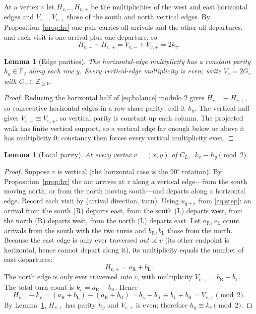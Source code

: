 \documentclass[11pt,letterpaper]{article}
\theoremstyle{plain}
\newtheorem{lemma}[theorem]{Lemma}
\theoremstyle{definition}
\newcommand{\Z}{\mathbb{Z}}
\newcommand{\F}{\mathbb{F}}
\newcommand{\turnR}{\mathrm{R}}
\newcommand{\turnL}{\mathrm{L}}
\begin{document}
\begin{NoHyper}
At a vertex $v$ let $H_{v,-},H_{v,+}$ be the multiplicities of the west and east
horizontal edges and $V_{v,-},V_{v,+}$ those of the south and north vertical edges.
By Proposition~\ref{prop:hv} one pair carries all arrivals and the other all
departures, and each visit is one arrival plus one departure, so
\begin{equation}\label{eq:balance}
H_{v,-}+H_{v,+}=V_{v,-}+V_{v,+}=2k_v .
\end{equation}

\begin{lemma}[Edge parities]\label{lem:edgeparity}
The horizontal-edge multiplicity has a constant parity $h_y\in\F_2$ along each row
$y$. Every vertical-edge multiplicity is even; write $V_e=2G_e$ with $G_e\in\Z_{\ge0}$.
\end{lemma}

\begin{proof}
Reducing the horizontal half of \eqref{eq:balance} modulo $2$ gives
$H_{v,-}\equiv H_{v,+}$, so consecutive horizontal edges in a row share parity;
call it $h_y$. The vertical half gives $V_{v,-}\equiv V_{v,+}$, so vertical parity is
constant up each column. The projected walk has finite vertical support, so a
vertical edge far enough below or above it has multiplicity $0$; constancy then forces
every vertical multiplicity even.
\end{proof}

\begin{lemma}[Local parity]\label{lem:localparity}
At every vertex $v=(x,y)$ of $C_L$, $\;k_v\equiv h_y\pmod2$.
\end{lemma}

\begin{proof}
Suppose $v$ is vertical (the horizontal case is the $90^\circ$ rotation). By
Proposition~\ref{prop:hv} the ant arrives at $v$ along a vertical edge---from the
south moving north, or from the north moving south---and departs along a horizontal
edge. Record each visit by (arrival direction, turn). Using
$u_{q+\varepsilon}$ from \eqref{eq:step}: an arrival from the south ($\turnR$) departs
east, from the south ($\turnL$) departs west, from the north ($\turnR$) departs west,
from the north ($\turnL$) departs east. Let $a_{\turnR},a_{\turnL}$ count arrivals
from the south with the two turns and $b_{\turnR},b_{\turnL}$ those from the north.
Because the east edge is only ever traversed \emph{out} of $v$ (its other endpoint is
horizontal, hence cannot depart along it), its multiplicity equals the number of east
departures:
\[
H_{v,+}=a_{\turnR}+b_{\turnL}.
\]
The north edge is only ever traversed \emph{into} $v$, with multiplicity
$V_{v,+}=b_{\turnR}+b_{\turnL}$. The total turn count is $k_v=a_{\turnR}+b_{\turnR}$.
Hence
\[
H_{v,+}-k_v=(a_{\turnR}+b_{\turnL})-(a_{\turnR}+b_{\turnR})=b_{\turnL}-b_{\turnR}
\equiv b_{\turnL}+b_{\turnR}=V_{v,+}\pmod2 .
\]
By Lemma~\ref{lem:edgeparity}, $H_{v,+}$ has parity $h_y$ and $V_{v,+}$ is even; therefore
$h_y\equiv k_v\pmod2$.
\end{proof}


\end{NoHyper}
\end{document}
